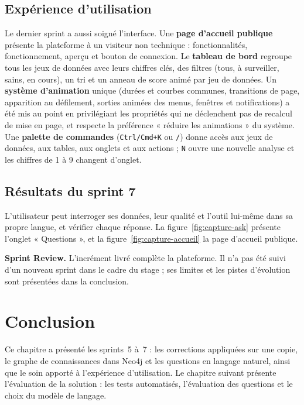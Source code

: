 \subsection{Expérience d'utilisation}

Le dernier sprint a aussi soigné l'interface. Une \textbf{page d'accueil publique} présente la plateforme à un visiteur non technique : fonctionnalités, fonctionnement, aperçu et bouton de connexion. Le \textbf{tableau de bord} regroupe tous les jeux de données avec leurs chiffres clés, des filtres (tous, à surveiller, sains, en cours), un tri et un anneau de score animé par jeu de données. Un \textbf{système d'animation} unique (durées et courbes communes, transitions de page, apparition au défilement, sorties animées des menus, fenêtres et notifications) a été mis au point en privilégiant les propriétés qui ne déclenchent pas de recalcul de mise en page, et respecte la préférence « réduire les animations » du système. Une \textbf{palette de commandes} (\texttt{Ctrl/Cmd+K} ou \texttt{/}) donne accès aux jeux de données, aux tables, aux onglets et aux actions ; \texttt{N} ouvre une nouvelle analyse et les chiffres de 1 à 9 changent d'onglet.

\subsection{Résultats du sprint 7}

L'utilisateur peut interroger ses données, leur qualité et l'outil lui-même dans sa propre langue, et vérifier chaque réponse. La figure~\ref{fig:capture-ask} présente l'onglet « Questions », et la figure~\ref{fig:capture-accueil} la page d'accueil publique.



\noindent\textbf{Sprint Review.} L'incrément livré complète la plateforme. Il n'a pas été suivi d'un nouveau sprint dans le cadre du stage ; ses limites et les pistes d'évolution sont présentées dans la conclusion.

\section*{Conclusion}
Ce chapitre a présenté les sprints~5 à~7 : les corrections appliquées sur une copie, le graphe de connaissances dans Neo4j et les questions en langage naturel, ainsi que le soin apporté à l'expérience d'utilisation. Le chapitre suivant présente l'évaluation de la solution : les tests automatisés, l'évaluation des questions et le choix du modèle de langage.
